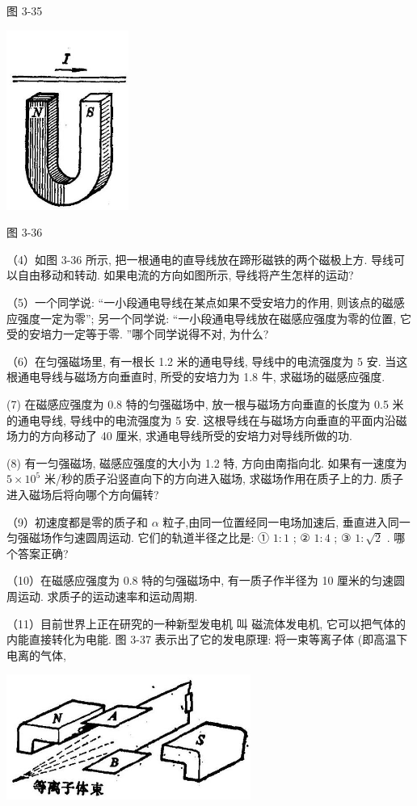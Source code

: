 \documentclass[10pt]{article}
\begin{document}
图 3-35

\begin{center}
\includegraphics[max width=0.3\textwidth]{images/01913056-1f15-74d8-9184-9aab52c9d66b_131_960005.jpg}
\end{center}

图 3-36

（4）如图 3-36 所示, 把一根通电的直导线放在蹄形磁铁的两个磁极上方. 导线可以自由移动和转动. 如果电流的方向如图所示, 导线将产生怎样的运动?

（5）一个同学说: “一小段通电导线在某点如果不受安培力的作用, 则该点的磁感应强度一定为零”; 另一个同学说: “一小段通电导线放在磁感应强度为零的位置, 它受的安培力一定等于零. ”哪个同学说得不对, 为什么?

（6）在匀强磁场里, 有一根长 1.2 米的通电导线, 导线中的电流强度为 5 安. 当这根通电导线与磁场方向垂直时, 所受的安培力为 1.8 牛, 求磁场的磁感应强度.

(7) 在磁感应强度为 0.8 特的匀强磁场中, 放一根与磁场方向垂直的长度为 0.5 米的通电导线, 导线中的电流强度为 5 安. 这根导线在与磁场方向垂直的平面内沿磁场力的方向移动了 40 厘米, 求通电导线所受的安培力对导线所做的功.

(8) 有一匀强磁场, 磁感应强度的大小为 1.2 特, 方向由南指向北. 如果有一速度为 \(5 \times {10}^{5}\) 米/秒的质子沿竖直向下的方向进入磁场, 求磁场作用在质子上的力. 质子进入磁场后将向哪个方向偏转?

（9）初速度都是零的质子和 \(\alpha\) 粒子,由同一位置经同一电场加速后, 垂直进入同一匀强磁场作匀速圆周运动. 它们的轨道半径之比是: ① \(1 : 1\) ; ② \(1 : 4\) ; ③ \(1 : \sqrt{2}\) . 哪个答案正确?

（10）在磁感应强度为 0.8 特的匀强磁场中, 有一质子作半径为 10 厘米的匀速圆周运动. 求质子的运动速率和运动周期.

（11）目前世界上正在研究的一种新型发电机 叫 磁流体发电机, 它可以把气体的内能直接转化为电能. 图 3-37 表示出了它的发电原理: 将一束等离子体 (即高温下电离的气体,

\begin{center}
\includegraphics[max width=0.6\textwidth]{images/01913056-1f15-74d8-9184-9aab52c9d66b_132_612102.jpg}
\end{center}
\end{document}
